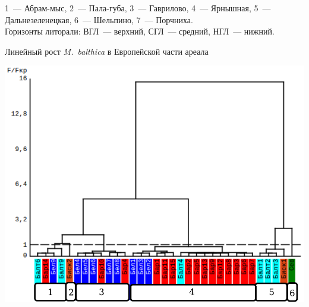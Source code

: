 \documentclass{beamer}
\begin{document}
\begin{frame}
\begin{minipage}[t]{.49\linewidth}
\begin{center}
			\end{center}
		\end{minipage}
\tiny{1~--- Абрам-мыс, 2~--- Пала-губа, 3~--- Гаврилово, 4~--- Ярнышная, 5~--- Дальнезеленецкая, 6~--- Шельпино, 7~--- Порчниха.\\
Горизонты литорали: ВГЛ~--- верхний, СГЛ~--- средний, НГЛ~--- нижний.}
\end{frame}


\begin{frame}{Линейный рост {\it M.~balthica} в Европейской части ареала}
	\begin{minipage}[t]{.52\linewidth}
		\begin{center}
			\includegraphics[width=\textwidth]{./Europe_clusters_usrednenie.pdf}
		\end{center}


\end{minipage}
\end{frame}
\end{document}
